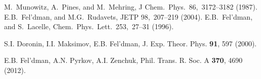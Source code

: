 \begin{thebibliography}{}
%
  M.~Munowitz, A.~Pines, and M.~Mehring, J Chem.~Phys.~86,~3172–3182 (1987).
%
%
%
E.B.~Fel’dman, and M.G.~Rudavets, JETP 98,~207–219 (2004).
%
E.B.~Fel’dman, and S.~Lacelle, Chem.~Phys.~Lett.~253,~27–31 (1996).
%
%
%
%
%
%


  S.I. Doronin, I.I. Maksimov, E.B. Fel'dman, J. Exp. Theor. Phys. {\bf 91}, 597 (2000).

 E.B. Fel'dman, A.N. Pyrkov, A.I. Zenchuk, Phil. Trans. R. Soc. A {\bf 370}, 4690 (2012).


\end{thebibliography}
